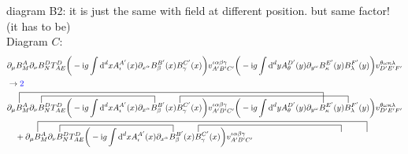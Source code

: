 diagram B2: it is just the same with field at different position. but same factor! (it has to be)\\
Diagram $C$: 
\begin{align}
	&\partial_\mu B_M^{A}  \partial_\nu B_N^D T^D_{AE} \bigg(-\imag g \int \ddx xA_\iota^{A'}(x) \partial_{x^\alpha} B_\beta^{B'} (x) B_\gamma^{C'}(x) \bigg) v^{\iota \alpha\beta\gamma}_{A'B'C'}
	\bigg(-\imag g \int \ddx yA_\theta^{D'}(y) \partial_{y^\omega} B_\kappa^{E'} (y) B_\lambda^{F'}(y) \bigg) v^{\theta \omega\kappa\lambda}_{D'E'F'}
	\\
	&\rightarrow {\color{blue} 2} \\
	&
	\contraction[3ex]{\partial_\mu }{B}{_M^{A}  \partial_\nu B_N^D T^D_{AE} \bigg(-\imag g \int \ddx xA_\iota^{A'}(x) \partial_{x^\alpha} B_\beta^{B'} (x) B_\gamma^{C'}(x) \bigg) v^{\iota \alpha\beta\gamma}_{A'B'C'}
		\bigg(-\imag g \int \ddx yA_\theta^{D'}(y) \partial_{y^\omega} }{B}
	\contraction[2ex]{\partial_\mu B_M^{A}  \partial_\nu }{B}{_N^D T^D_{AE} \bigg(-\imag g \int \ddx xA_\iota^{A'}(x) \partial_{x^\alpha} }{B}
	\contraction[2ex]{\partial_\mu B_M^{A}  \partial_\nu B_N^D T^D_{AE} \bigg(-\imag g \int \ddx xA_\iota^{A'}(x) \partial_{x^\alpha} B_\beta^{B'} (x) }{B}{_\gamma^{C'}(x) \bigg) v^{\iota \alpha\beta\gamma}_{A'B'C'}
		\bigg(-\imag g \int \ddx yA_\theta^{D'}(y) \partial_{y^\omega} B_\kappa^{E'} (y) }{B}
	\partial_\mu B_M^{A}  \partial_\nu B_N^D T^D_{AE} \bigg(-\imag g \int \ddx xA_\iota^{A'}(x) \partial_{x^\alpha} B_\beta^{B'} (x) B_\gamma^{C'}(x) \bigg) v^{\iota \alpha\beta\gamma}_{A'B'C'}
	\bigg(-\imag g \int \ddx yA_\theta^{D'}(y) \partial_{y^\omega} B_\kappa^{E'} (y) B_\lambda^{F'}(y) \bigg) v^{\theta\omega\kappa\lambda}_{D'E'F'}
	\nl
	+\contraction[3ex]{\partial_\mu }{B}{_M^{A}  \partial_\nu B_N^D T^D_{AE} \bigg(-\imag g \int \ddx xA_\iota^{A'}(x) \partial_{x^\alpha} B_\beta^{B'} (x) B_\gamma^{C'}(x) \bigg) v^{\iota \alpha\beta\gamma}_{A'B'C'}
		\bigg(-\imag g \int \ddx yA_\theta^{D'}(y) \partial_{y^\omega} B_\omega^{E'} (y) }{B}
	\contraction[2ex]{\partial_\mu B_M^{A}  \partial_\nu }{B}{_N^D T^D_{AE} \bigg(-\imag g \int \ddx xA_\iota^{A'}(x) \partial_{x^\alpha} }{B}
	\contraction[2ex]{\partial_\mu B_M^{A}  \partial_\nu B_N^D T^D_{AE} \bigg(-\imag g \int \ddx xA_\iota^{A'}(x) \partial_{x^\alpha} B_\beta^{B'} (x) }{B}{_\gamma^{C'}(x) \bigg) v^{\iota \alpha\beta\gamma}_{A'B'C'}
		\bigg(-\imag g \int \ddx yA_\theta^{D'}(y) \partial_{y^\omega}}{B}
	\partial_\mu B_M^{A}  \partial_\nu B_N^D T^D_{AE} \bigg(-\imag g \int \ddx xA_\iota^{A'}(x) \partial_{x^\alpha} B_\beta^{B'} (x) B_\gamma^{C'}(x) \bigg) v^{\iota \alpha\beta\gamma}_{A'B'C'}

\end{align}
